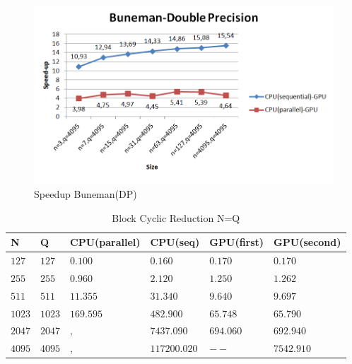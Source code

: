 \begin{figure}[H]
   \centering
       \includegraphics[width=1\textwidth]{grafhmata/buneman_dp_speedup.png}
   \caption{Speedup Buneman(DP)}
   \label{fig:Speedup Buneman(DP)}
\end{figure}

   \begin{table}[H]
\caption{Block Cyclic Reduction N=Q} 
\centering 
\begin{tabular}{| l |  p{1cm} |p{}| p{} |  p{}| p{} | } 
\hline\hline 
N & Q & CPU(parallel) & CPU(seq) & GPU(first)  & GPU(second)\\ [0.8ex] 
\hline
$127$ &	$127$ & $0.100$	&	$0.160$ & $0.170$ & $0.170$ \\
$255$ &	$255$ & $0.960$	&	$2.120$ & $1.250$ & $1.262$ \\
$511$ &	$511$ & $11.355$	&	$31.340$ & $9.640$ & $9.697$ \\
$1023$ &	$1023$ & $169.595$	&	$482.900$ & $65.748$ & $65.790$ \\
$2047$ &	$2047$ & $,$	&	$7437.090$ & $694.060$ & $692.940$ \\
$4095$ & $4095$  & $,$	&  $117200.020$ & $--$ & $7542.910$ \\[1ex]
\hline 
\end{tabular}
\label{table:bcr_n=q} 
\end{table} 


